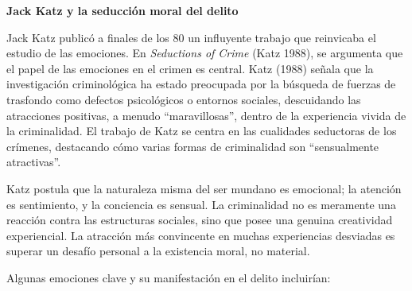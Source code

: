 \documentclass[
  spanish,
  letterpaper,
  DIV=11,
  numbers=noendperiod]{scrreprt}
\begin{document}
\begin{tcolorbox}[enhanced jigsaw, bottomtitle=1mm, toprule=.15mm, colbacktitle=quarto-callout-note-color!10!white, bottomrule=.15mm, leftrule=.75mm, colframe=quarto-callout-note-color-frame, opacitybacktitle=0.6, titlerule=0mm, breakable, colback=white, left=2mm, arc=.35mm, title=\textcolor{quarto-callout-note-color}{\faInfo}\hspace{0.5em}{Nota}, toptitle=1mm, coltitle=black, rightrule=.15mm, opacityback=0]

\textbf{Jack Katz y la seducción moral del delito}

Jack Katz publicó a finales de los 80 un influyente trabajo que
reinvicaba el estudio de las emociones. En \emph{Seductions of Crime}
(Katz 1988), se argumenta que el papel de las emociones en el crimen es
central. Katz (1988) señala que la investigación criminológica ha estado
preocupada por la búsqueda de fuerzas de trasfondo como defectos
psicológicos o entornos sociales, descuidando las atracciones positivas,
a menudo ``maravillosas'', dentro de la experiencia vivida de la
criminalidad. El trabajo de Katz se centra en las cualidades seductoras
de los crímenes, destacando cómo varias formas de criminalidad son
``sensualmente atractivas''.

Katz postula que la naturaleza misma del ser mundano es emocional; la
atención es sentimiento, y la conciencia es sensual. La criminalidad no
es meramente una reacción contra las estructuras sociales, sino que
posee una genuina creatividad experiencial. La atracción más convincente
en muchas experiencias desviadas es superar un desafío personal a la
existencia moral, no material.

Algunas emociones clave y su manifestación en el delito incluirían:


\end{tcolorbox}
\end{document}
